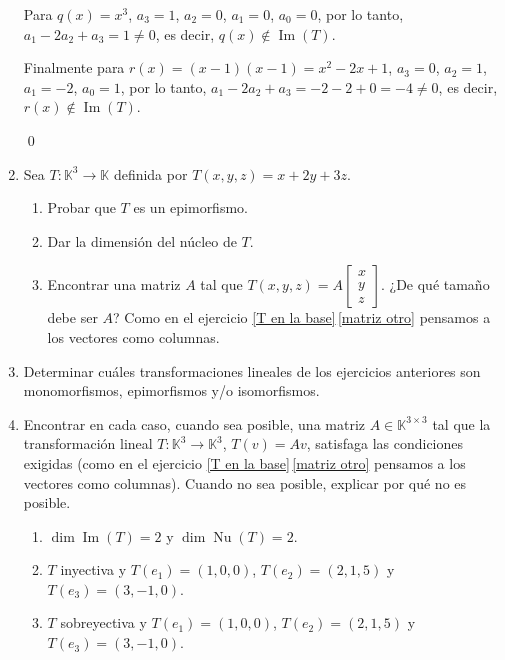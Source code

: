 \begin{enumerate}[topsep=6pt, itemsep=.4cm]
    Para $q(x)=x^3$, $a_3=1$, $a_2=0$, $a_1=0$, $a_0=0$, por lo tanto, $a_1-2a_2+a_3=1 \ne 0$, es decir, $q(x) \notin \operatorname{Im}(T)$. 
    
    Finalmente para $r(x)=(x-1)(x-1) = x^2 -2x +1$, $a_3=0$, $a_2=1$, $a_1=-2$, $a_0=1$, por lo tanto, $a_1-2a_2+a_3=-2-2+0=-4 \ne 0$, es decir, $r(x) \notin \operatorname{Im}(T)$.
    
    \qed



    \item\label{funcional ej}  Sea $T:\mathbb{K}^3\longrightarrow\mathbb{K}$ definida por $T(x,y,z)=x+2y+3z$.
    \begin{enumerate}
        \item\label{funcional ej a} Probar que $T$ es un epimorfismo.
        \item\label{funcional ej b} Dar la dimensión del núcleo de $T$.
        \item\label{funcional ej c} Encontrar una matriz $A$ tal que
            $T(x,y,z)=A\begin{bmatrix}
            x\\y\\z \end{bmatrix}$. ¿De qué tamaño debe ser $A$? Como en el ejercicio \ref{T en la base}\,\ref{matriz otro} pensamos a los vectores como columnas. 
    \end{enumerate}

    \rta
    
    
    \item Determinar cuáles transformaciones lineales de los ejercicios anteriores son monomorfismos, epimorfismos y/o isomorfismos.
    
    \rta


    \item\label{usar-1} Encontrar en cada caso, cuando sea posible, una matriz $A\in\mathbb{K}^{3\times 3}$ tal que la transformación lineal $T:\mathbb{K}^3\longrightarrow\mathbb{K}^3$, $T(v)=Av$, satisfaga las condiciones exigidas (como en el ejercicio  \ref{T en la base}\,\ref{matriz otro} pensamos a los vectores como columnas). Cuando no sea posible, explicar por qué no es posible.
    \begin{enumerate}[ topsep=5pt,itemsep=5pt]
        \item\label{usar-1 a} $\operatorname{dim} \operatorname{Im}(T)=2$ y $\operatorname{dim}\operatorname{Nu}(T)=2$.
        \item\label{usar-1 b} $T$ inyectiva y $T(e_1)=(1,0,0)$, $T(e_2)=(2,1,5)$ y $T(e_3)=(3,-1,0)$.
        \item\label{usar-1 c} $T$ sobreyectiva y $T(e_1)=(1,0,0)$, $T(e_2)=(2,1,5)$ y $T(e_3)=(3,-1,0)$.
        

\end{enumerate}
\end{enumerate}
